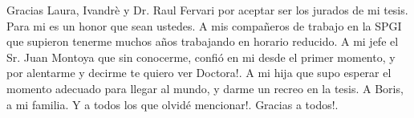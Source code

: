 {Gracias Laura, Ivandr\`e y Dr. Raul Fervari por aceptar ser los jurados de mi tesis. Para mi es un honor que sean ustedes.
A mis compa\~neros de trabajo en la SPGI que supieron tenerme muchos a\~nos trabajando en horario reducido. A mi jefe el Sr. Juan Montoya que sin conocerme, confi\'o en mi desde el primer momento, y por alentarme y decirme te quiero ver Doctora!.
A mi hija que supo esperar el momento adecuado para llegar al mundo, y darme un recreo en la tesis. A Boris, a mi familia.
Y a todos los que olvid\'e mencionar!. Gracias a todos!.
}

\vspace{\fill}
